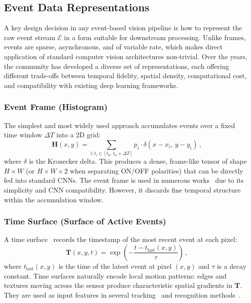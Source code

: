 \subsection{Event Data Representations}
\label{sec:pre_repr}

A key design decision in any event-based vision pipeline is how to represent the raw event stream $\mathcal{E}$ in a form suitable for downstream processing. Unlike frames, events are sparse, asynchronous, and of variable rate, which makes direct application of standard computer vision architectures non-trivial. Over the years, the community has developed a diverse set of representations, each offering different trade-offs between temporal fidelity, spatial density, computational cost, and compatibility with existing deep learning frameworks.


\subsubsection{Event Frame (Histogram)}
\label{sec:repr_frame}

The simplest and most widely used approach accumulates events over a fixed time window $\Delta T$ into a 2D grid:
\begin{equation}
\label{eq:event_frame}
    \mathbf{H}(x, y) = \sum_{i : t_i \in [t_0, \, t_0 + \Delta T]} p_i \cdot \delta(x - x_i, \, y - y_i) \,,
\end{equation}
where $\delta$ is the Kronecker delta. This produces a dense, frame-like tensor of shape $H \times W$ (or $H \times W \times 2$ when separating ON/OFF polarities) that can be directly fed into standard CNNs. The event frame is used in numerous works~\cite{maqueda2018steering,amir2017dvs128gesture,perot2020red} due to its simplicity and CNN compatibility. However, it discards fine temporal structure within the accumulation window.


\subsubsection{Time Surface (Surface of Active Events)}
\label{sec:repr_timesurface}

A time surface~\cite{lagorce2017hots} records the timestamp of the most recent event at each pixel:
\begin{equation}
\label{eq:time_surface}
    \mathbf{T}(x, y, t) = \exp\left( - \frac{t - t_{\text{last}}(x, y)}{\tau} \right) \,,
\end{equation}
where $t_{\text{last}}(x,y)$ is the time of the latest event at pixel $(x,y)$ and $\tau$ is a decay constant. Time surfaces naturally encode local motion patterns: edges and textures moving across the sensor produce characteristic spatial gradients in $\mathbf{T}$. They are used as input features in several tracking~\cite{gehrig2019eklt} and recognition methods~\cite{sironi2018ncars}.


